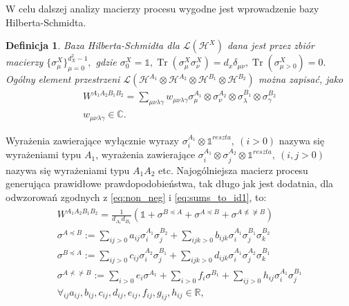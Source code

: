 \documentclass[10pt]{article} %
\newtheorem{definicja}{Definicja}
\DeclareMathOperator{\Trs}{Tr}
\newcommand{\Mats}[1]{\mathcal{L}(#1)}
\newcommand{\Hx}[1]{\mathcal{H}^{#1}}
\newcommand{\LHx}[1]{\Mats{\Hx{#1}}}
\newcommand{\Tr}[1]{\Trs(#1)}
\newcommand{\WAll}{W^{A_1A_2B_1B_2}}
\begin{document}
W celu dalszej analizy macierzy procesu wygodne jest wprowadzenie bazy Hilberta-Schmidta.
\begin{definicja}
Baza Hilberta-Schmidta dla $\LHx{X}$ dana jest przez zbiór macierzy $\{\sigma^X_\mu\}^{d^2_X-1}_{\mu=0},$ gdzie $\sigma^X_0 = \mathbb{1}, \Tr{\sigma^X_\mu\sigma^X_\nu}=d_x\delta_{\mu\nu}, \Tr{\sigma^X_{\mu>0}}=0.$ Ogólny element przestrzeni $\Mats{\Hx{A_1}\otimes\Hx{A_2}\otimes\Hx{B_1}\otimes\Hx{B_2}}$ można zapisać, jako
\begin{gather}
\WAll = \sum_{\mu\nu\lambda\gamma} w_{\mu\nu\lambda\gamma} \sigma_\mu^{A_1}\otimes\sigma_\nu^{A_2}\otimes\sigma_\lambda^{B_1}\otimes\sigma_\gamma^{B_2} \\
w_{\mu\nu\lambda\gamma} \in \mathds{C} \nonumber.
\end{gather}
\end{definicja}
Wyrażenia zawierające wyłącznie wyrazy $\sigma^{A_1}_i \otimes \mathbb{1}^{reszta},~(i > 0)$ nazywa się wyrażeniami typu $A_1$, wyrażenia zawierające  $\sigma^{A_1}_i \otimes \sigma^{A_2}_j \otimes \mathbb{1}^{reszta},~(i, j > 0)$ nazywa się wyrażeniami typu $A_1A_2$ etc.
Najogólniejsza macierz procesu generująca prawidłowe prawdopodobieństwa, tak długo jak jest dodatnia, dla odwzorowań zgodnych z \eqref{eq:non_neg} i \eqref{eq:sums_to_id1}, to:
\begin{gather}
\label{eq:genw}
\begin{gathered}
\WAll = \frac{1}{d_{A_1}d_{B_1}}(\mathbb{1} +\sigma^{B \preceq A} + \sigma^{A \preceq B} + \sigma^{A \npreceq \nsucceq B}) \\
\sigma^{A \preceq B} := \sum_{ij>0} a_{ij} \sigma^{A_1}_i \sigma^{B_2}_j + \sum_{ijk>0} b_{ijk} \sigma^{A_1}_i \sigma^{B_1}_j \sigma^{B_2}_k \\
\sigma^{B \preceq A} := \sum_{ij>0} c_{ij} \sigma^{A_2}_i \sigma^{B_1}_j + \sum_{ijk>0} d_{ijk} \sigma^{A_1}_i \sigma^{A_2}_j \sigma^{B_1}_k \\
 \sigma^{A \nprec \nsucc B} := \sum_{i>0} e_i  \sigma^{A_1} + \sum_{i>0} f_i  \sigma^{B_1} + \sum_{ij>0} h_{ij} \sigma^{A_1}_i \sigma^{B_1}_j \\
 \forall_{ij} a_{ij}, b_{ij}, c_{ij}, d_{ij}, e_{ij}, f_{ij}, g_{ij}, h_{ij} \in \mathds{R},
\end{gathered}
\end{gather}
\end{document}

